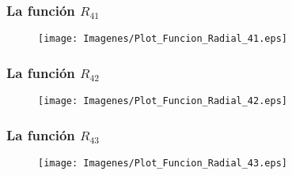 \documentclass[12pt]{beamer}
\begin{document}
\begin{frame}
\frametitle{La función $R_{41}$}
\begin{figure}
   \centering
   \texttt{[image: Imagenes/Plot\_Funcion\_Radial\_41.eps]}
\end{figure}
\end{frame}
\begin{frame}
\frametitle{La función $R_{42}$}
\begin{figure}
   \centering
   \texttt{[image: Imagenes/Plot\_Funcion\_Radial\_42.eps]}
\end{figure}
\end{frame}
\begin{frame}
\frametitle{La función $R_{43}$}
\begin{figure}
   \centering
   \texttt{[image: Imagenes/Plot\_Funcion\_Radial\_43.eps]}
\end{figure}
\end{frame}
    
\end{document}
